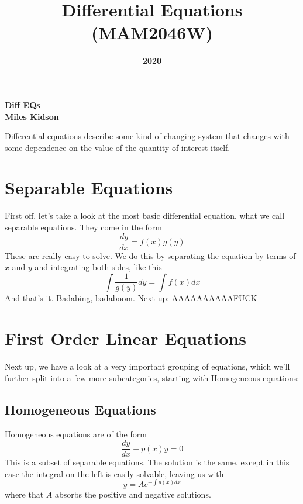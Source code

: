 \documentclass[12pt]{article}
\title{Differential Equations (MAM2046W)}
\date{\textbf{2020}}
\author{}
\numberwithin{equation}{section}
\begin{document}
    \begin{titlepage}
        \maketitle
        \center
        \textbf{\large{Diff EQs}} \\
        \textbf{\large{Miles Kidson}}
        \tableofcontents
    \end{titlepage}

    Differential equations describe some kind of changing system that changes with some dependence 
    on the value of the quantity of interest itself.
    
    \section{Separable Equations}
    First off, let's take a look at the most basic differential equation, what we call separable 
    equations. They come in the form 
    \begin{equation}
        \frac{dy}{dx} = f(x)g(y)
    \end{equation}
    These are really easy to solve. We do this by separating the equation by terms of $x$ and $y$ 
    and integrating both sides, like this
    \begin{equation}
        \int\frac{1}{g(y)}dy = \int f(x)dx
    \end{equation}
    And that's it. Badabing, badaboom. Next up: AAAAAAAAAAFUCK

    \section{First Order Linear Equations}
    Next up, we have a look at a very important grouping of equations, which we'll further split 
    into a few more subcategories, starting with Homogeneous equations:
    \subsection{Homogeneous Equations}
    Homogeneous equations are of the form 
    \begin{equation}
        \frac{dy}{dx} + p(x)y = 0
    \end{equation}
    This is a subset of separable equations. The solution is the same, except in this case the 
    integral on the left is easily solvable, leaving us with 
    \begin{equation}
        y = A e^{-\int p(x)dx}
    \end{equation}
    where that $A$ absorbs the positive and negative solutions. 
\end{document}
